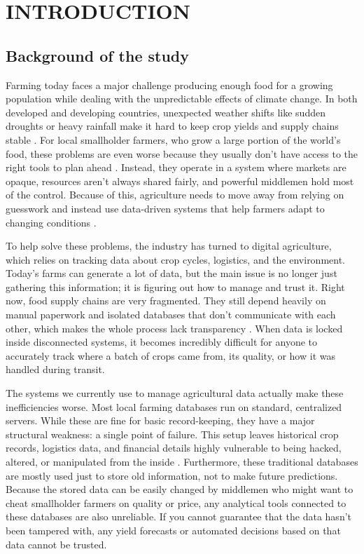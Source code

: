 \chapter{INTRODUCTION}

\section{Background of the study}

Farming today faces a major challenge producing enough food for a growing population while dealing with the unpredictable effects of climate change. In both developed and developing countries, unexpected weather shifts like sudden droughts or heavy rainfall make it hard to keep crop yields and supply chains stable \parencite{padhiary2025emerging}. For local smallholder farmers, who grow a large portion of the world's food, these problems are even worse because they usually don't have access to the right tools to plan ahead \parencite{raj2022survey}. Instead, they operate in a system where markets are opaque, resources aren't always shared fairly, and powerful middlemen hold most of the control. Because of this, agriculture needs to move away from relying on guesswork and instead use data-driven systems that help farmers adapt to changing conditions \parencite{lin2017blockchain}.

To help solve these problems, the industry has turned to digital agriculture, which relies on tracking data about crop cycles, logistics, and the environment. Today's farms can generate a lot of data, but the main issue is no longer just gathering this information; it is figuring out how to manage and trust it. Right now, food supply chains are very fragmented. They still depend heavily on manual paperwork and isolated databases that don't communicate with each other, which makes the whole process lack transparency \parencite{sharma2023blockchain}. When data is locked inside disconnected systems, it becomes incredibly difficult for anyone to accurately track where a batch of crops came from, its quality, or how it was handled during transit.

The systems we currently use to manage agricultural data actually make these inefficiencies worse. Most local farming databases run on standard, centralized servers. While these are fine for basic record-keeping, they have a major structural weakness: a single point of failure. This setup leaves historical crop records, logistics data, and financial details highly vulnerable to being hacked, altered, or manipulated from the inside \parencite{alabsi2023blockchain}. Furthermore, these traditional databases are mostly used just to store old information, not to make future predictions. Because the stored data can be easily changed by middlemen who might want to cheat smallholder farmers on quality or price, any analytical tools connected to these databases are also unreliable. If you cannot guarantee that the data hasn't been tampered with, any yield forecasts or automated decisions based on that data cannot be trusted.


